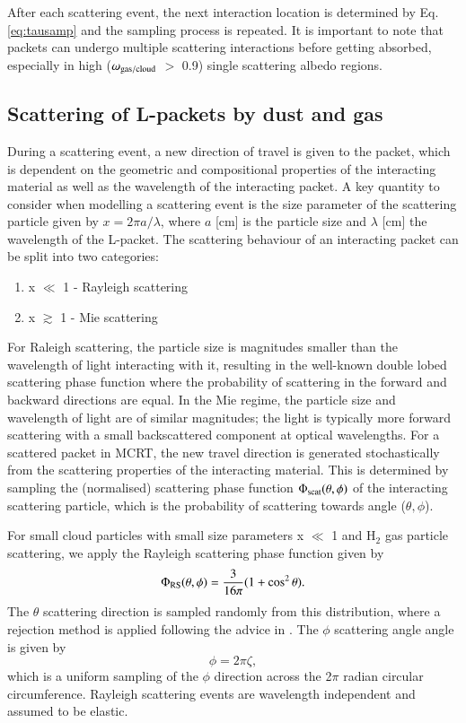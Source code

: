 \documentclass{aa}
\begin{document}
After each scattering event, the next interaction location is determined by Eq. \eqref{eq:tausamp} and the sampling process is repeated.
It is important to note that packets can undergo multiple scattering interactions before getting absorbed, especially in high ($\omega_{\rm gas/cloud}$ $>$ 0.9) single scattering albedo regions.

\subsection{Scattering of L-packets by dust and gas}

During a scattering event, a new direction of travel is given to the packet, which is dependent on the geometric and compositional properties of the interacting material as well as the wavelength of the interacting packet.
A key quantity to consider when modelling a scattering event is the size parameter of the scattering particle given by $x = 2\pi a /\lambda$, where $a$ [cm] is the particle size and $\lambda$ [cm] the wavelength of the L-packet.
The scattering behaviour of an interacting packet can be split into two categories:
\begin{enumerate}
\item x $\ll$ 1 - Rayleigh scattering
\item x $\gtrsim$ 1 - Mie scattering
\end{enumerate}
For Raleigh scattering, the particle size is magnitudes smaller than the wavelength of light interacting with it, resulting in the well-known double lobed scattering phase function where the probability of scattering in the forward and backward directions are equal.
In the Mie regime, the particle size and wavelength of light are of similar magnitudes; the light is typically more forward scattering with a small backscattered component at optical wavelengths.
For a scattered packet in MCRT, the new travel direction is generated stochastically from the scattering properties of the interacting material.
This is determined by sampling the (normalised) scattering phase function $\Phi_{\rm scat}(\theta, \phi)$ of the interacting scattering particle, which is the probability of scattering towards angle ($\theta, \phi$).

For small cloud particles with small size parameters x $\ll$ 1 and H$_{2}$ gas particle scattering, we apply the Rayleigh scattering phase function given by
\begin{equation}
\Phi_{\rm RS}(\theta, \phi) = \frac{3}{16\pi}(1 + \cos^{2}\theta).
\end{equation}
The $\theta$ scattering direction is sampled randomly from this distribution, where a rejection method is applied following the advice in \citet{Whitney2011}.
The $\phi$ scattering angle angle is given by
\begin{equation}
\label{eq:phi}
\phi = 2\pi\zeta,
\end{equation}
which is a uniform sampling of the $\phi$ direction across the 2$\pi$ radian circular circumference.
Rayleigh scattering events are wavelength independent and assumed to be elastic.
\end{document}
